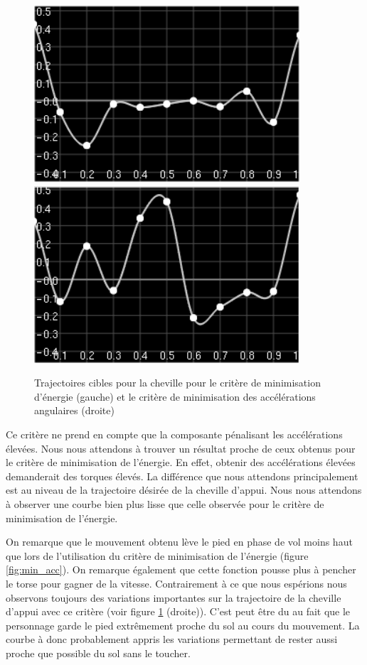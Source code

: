 \documentclass[runningheads,a4paper]{llncs}
\begin{document}
\vspace*{-1.25cm}
\begin{figure}[h]
\centering
\includegraphics[scale=0.5]{strips/stance_ankle_min_torque.png}
\includegraphics[scale=0.5]{strips/stance_ankle_min_acc.png}
\caption{Trajectoires cibles pour la cheville pour le critère de minimisation d'énergie (gauche) et le critère de minimisation des accélérations angulaires (droite)}
\label{fig:traj_ankle_min_torque}
\label{fig:traj_ankle_min_acc}
\end{figure}
Ce critère ne prend en compte que la composante pénalisant les accélérations élevées. Nous nous attendons à trouver un résultat proche de ceux obtenus pour le critère de minimisation de l'énergie. En effet, obtenir des accélérations élevées demanderait des torques élevés. La différence que nous attendons principalement est au niveau de la trajectoire désirée de la cheville d'appui. Nous nous attendons à observer une courbe bien plus lisse que celle observée pour le critère de minimisation de l'énergie.

On remarque que le mouvement obtenu lève le pied en phase de vol moins haut que lors de l'utilisation du critère de minimisation de l'énergie (figure \ref{fig:min_acc}). On remarque également que cette fonction pousse plus à pencher le torse pour gagner de la vitesse.
 Contrairement à ce que nous espérions nous observons toujours des variations importantes sur la trajectoire de la cheville d'appui avec ce critère (voir figure \ref{fig:traj_ankle_min_acc} (droite)). C'est peut être du au fait que le personnage garde le pied extrêmement proche du sol au cours du mouvement. La courbe à donc probablement appris les variations permettant de rester aussi proche que possible du sol sans le toucher.
\end{document}
